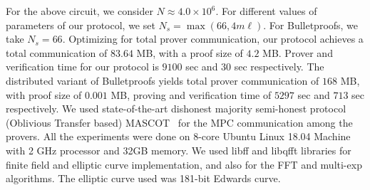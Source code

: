 For the above circuit, we consider $N\approx 4.0\times 10^6$. For different
values of parameters of our protocol, we set $N_s=\max(66,4m\ell)$.
For Bulletproofs, we take $N_s=66$. Optimizing for total prover communication, our
protocol achieves a total communication of $83.64$ MB, with a proof size of
$4.2$ MB. Prover and verification time for our protocol is  $9100$ sec and $30$ sec
respectively. The distributed variant of Bulletproofs yields total prover
communication of $168$ MB, with proof size of $0.001$ MB, proving and
verification time of $5297$ sec and $713$ sec respectively. 
We used state-of-the-art dishonest majority semi-honest protocol (Oblivious Transfer based) MASCOT~\cite{KOS16} for the MPC communication among the provers. All the experiments were done on 8-core Ubuntu Linux 18.04 Machine with 2 GHz processor and 32GB memory. We used libff and libqfft libraries for finite field and elliptic curve implementation, and also for the FFT and multi-exp algorithms. The elliptic curve used was 181-bit Edwards curve. 
